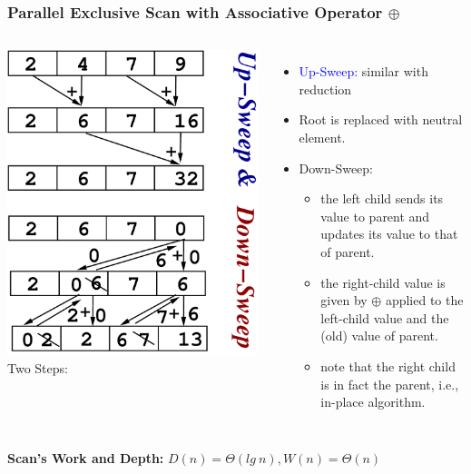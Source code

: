 \documentclass{beamer}
\newcommand{\blue}[1]{\textcolor{Blue}{{#1}}}
\renewcommand{\emph}[1]{\textcolor{CosGreen}{ #1}}
\newcommand{\emp}[1]{\textcolor{DikuRed}{ #1}}
\begin{document}
\begin{frame}[fragile,t]
  \frametitle{Parallel Exclusive Scan with Associative Operator $\oplus$}
\bigskip

\begin{columns}
        \includegraphics[height=30ex]{img/day3/ScanEg} 
Two Steps:
\begin{itemize}
    \item \blue{Up-Sweep:} similar with reduction
    \item Root is replaced with neutral element.
    \item \emp{Down-Sweep:} 
    \begin{itemize}
        \item the left child sends its value to parent and 
                updates its value to that of parent.
        \item the right-child value is given by $\oplus$ 
                applied to the left-child value and
                the (old) value of parent.
        \item note that the right child is in fact the parent,
                i.e., in-place algorithm.
    \end  {itemize}
\end  {itemize}
\end{columns}\bigskip

{\bf Scan's Work and Depth:} \emph{$D(n) = \Theta(lg \ n), W(n) = \Theta(n)$}

\end{frame}
\end{document}
